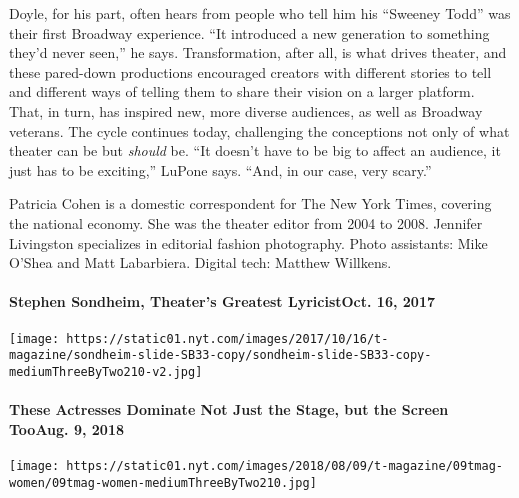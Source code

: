 Doyle, for his part, often hears from people who tell him his ``Sweeney
Todd'' was their first Broadway experience. ``It introduced a new
generation to something they'd never seen,'' he says. Transformation,
after all, is what drives theater, and these pared-down productions
encouraged creators with different stories to tell and different ways of
telling them to share their vision on a larger platform. That, in turn,
has inspired new, more diverse audiences, as well as Broadway veterans.
The cycle continues today, challenging the conceptions not only of what
theater can be but \emph{should} be. ``It doesn't have to be big to
affect an audience, it just has to be exciting,'' LuPone says. ``And, in
our case, very scary.''

Patricia Cohen is a domestic correspondent for The New York Times,
covering the national economy. She was the theater editor from 2004 to
2008. Jennifer Livingston specializes in editorial fashion photography.
Photo assistants: Mike O'Shea and Matt Labarbiera. Digital tech: Matthew
Willkens.

\href{https://www.nytimes.com/2017/10/16/t-magazine/lin-manuel-miranda-stephen-sondheim.html}{}

\hypertarget{stephen-sondheim-theaters-greatest-lyricistoct-16-2017}{%
\paragraph{Stephen Sondheim, Theater's Greatest LyricistOct. 16,
2017}\label{stephen-sondheim-theaters-greatest-lyricistoct-16-2017}}

\texttt{[image: https://static01.nyt.com/images/2017/10/16/t-magazine/sondheim-slide-SB33-copy/sondheim-slide-SB33-copy-mediumThreeByTwo210-v2.jpg]}
\href{https://www.nytimes.com/2018/08/09/t-magazine/allison-janney-idina-menzel-female-actresses.html}{}

\hypertarget{these-actresses-dominate-not-just-the-stage-but-the-screen-tooaug-9-2018}{%
\paragraph{These Actresses Dominate Not Just the Stage, but the Screen
TooAug. 9,
2018}\label{these-actresses-dominate-not-just-the-stage-but-the-screen-tooaug-9-2018}}

\texttt{[image: https://static01.nyt.com/images/2018/08/09/t-magazine/09tmag-women/09tmag-women-mediumThreeByTwo210.jpg]}
\href{https://www.nytimes.com/2018/04/16/t-magazine/broadway-1980s-actors-sarah-jessica-parker-willem-dafoe.html}{}

